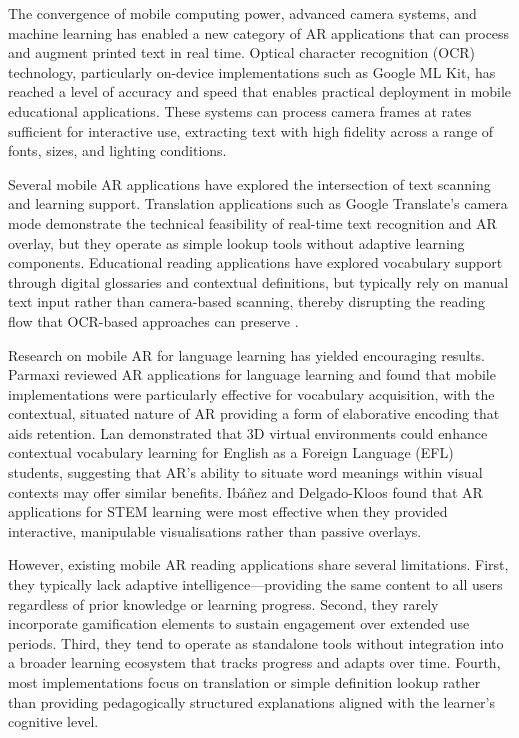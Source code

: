 The convergence of mobile computing power, advanced camera systems, and machine learning has enabled a new category of AR applications that can process and augment printed text in real time. Optical character recognition (OCR) technology, particularly on-device implementations such as Google ML Kit, has reached a level of accuracy and speed that enables practical deployment in mobile educational applications. These systems can process camera frames at rates sufficient for interactive use, extracting text with high fidelity across a range of fonts, sizes, and lighting conditions.

Several mobile AR applications have explored the intersection of text scanning and learning support. Translation applications such as Google Translate's camera mode demonstrate the technical feasibility of real-time text recognition and AR overlay, but they operate as simple lookup tools without adaptive learning components. Educational reading applications have explored vocabulary support through digital glossaries and contextual definitions, but typically rely on manual text input rather than camera-based scanning, thereby disrupting the reading flow that OCR-based approaches can preserve \cite{chen2017}.

Research on mobile AR for language learning has yielded encouraging results. Parmaxi \cite{parmaxi2020} reviewed AR applications for language learning and found that mobile implementations were particularly effective for vocabulary acquisition, with the contextual, situated nature of AR providing a form of elaborative encoding that aids retention. Lan \cite{lan2015} demonstrated that 3D virtual environments could enhance contextual vocabulary learning for English as a Foreign Language (EFL) students, suggesting that AR's ability to situate word meanings within visual contexts may offer similar benefits. Ib\'{a}\~{n}ez and Delgado-Kloos \cite{ibanezmolina2018} found that AR applications for STEM learning were most effective when they provided interactive, manipulable visualisations rather than passive overlays.

However, existing mobile AR reading applications share several limitations. First, they typically lack adaptive intelligence---providing the same content to all users regardless of prior knowledge or learning progress. Second, they rarely incorporate gamification elements to sustain engagement over extended use periods. Third, they tend to operate as standalone tools without integration into a broader learning ecosystem that tracks progress and adapts over time. Fourth, most implementations focus on translation or simple definition lookup rather than providing pedagogically structured explanations aligned with the learner's cognitive level.

